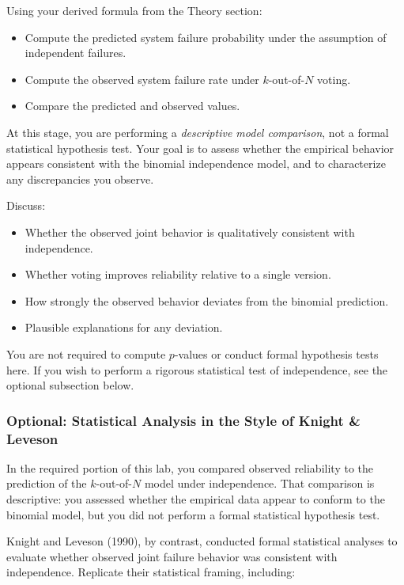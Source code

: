 Using your derived formula from the Theory section:

\begin{itemize}
  \item Compute the predicted system failure probability under the assumption of independent failures.
  \item Compute the observed system failure rate under $k$-out-of-$N$ voting.
  \item Compare the predicted and observed values.
\end{itemize}

At this stage, you are performing a \emph{descriptive model comparison}, not a formal statistical hypothesis test.
Your goal is to assess whether the empirical behavior appears consistent with the binomial independence model, and to characterize any discrepancies you observe.

Discuss:

\begin{itemize}
  \item Whether the observed joint behavior is qualitatively consistent with independence.
  \item Whether voting improves reliability relative to a single version.
  \item How strongly the observed behavior deviates from the binomial prediction.
  \item Plausible explanations for any deviation.
\end{itemize}

You are not required to compute $p$-values or conduct formal hypothesis tests here.
If you wish to perform a rigorous statistical test of independence, see the optional subsection below.

\subsubsection{Optional: Statistical Analysis in the Style of Knight \& Leveson}

In the required portion of this lab, you compared observed reliability to the prediction of the $k$-out-of-$N$ model under independence.
That comparison is descriptive: you assessed whether the empirical data appear to conform to the binomial model, but you did not perform a formal statistical hypothesis test.

Knight and Leveson (1990), by contrast, conducted formal statistical analyses to evaluate whether observed joint failure behavior was consistent with independence.
Replicate their statistical framing, including:

